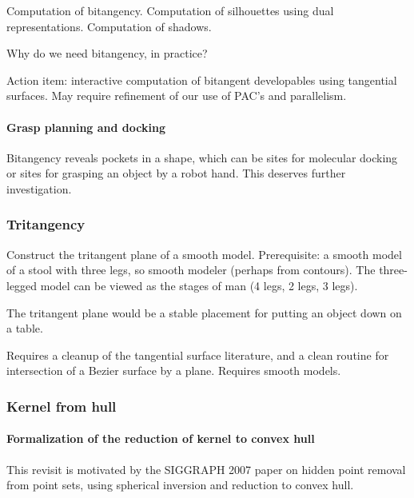 \documentclass[11pt]{article}
\begin{document}
Computation of bitangency.
Computation of silhouettes using dual representations.
Computation of shadows.

Why do we need bitangency, in practice?

Action item: interactive computation of bitangent developables using tangential surfaces.
May require refinement of our use of PAC's and parallelism.


\paragraph{Grasp planning and docking}

Bitangency reveals pockets in a shape, which can be sites for molecular docking
or sites for grasping an object by a robot hand.
This deserves further investigation.


\subsubsection{Tritangency}

Construct the tritangent plane of a smooth model.
Prerequisite: a smooth model of a stool with three legs, so smooth modeler
(perhaps from contours).
The three-legged model can be viewed as the stages of man (4 legs, 2 legs, 3 legs).

The tritangent plane would be a stable placement for putting an object down on a table.

Requires a cleanup of the tangential surface literature,
and a clean routine for intersection of a Bezier surface by a plane.
Requires smooth models.


\subsubsection{Kernel from hull}

\paragraph{Formalization of the reduction of kernel to convex hull}

This revisit is motivated by the SIGGRAPH 2007 paper on hidden point removal from point sets, 
using spherical inversion and reduction to convex hull.
\end{document}
